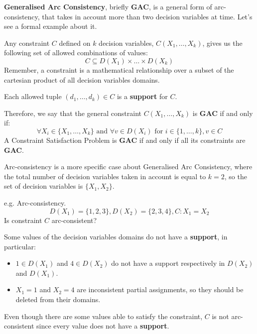 \textbf{Generalised Arc Consistency}, briefly \textbf{GAC}, is a general form of arc-consistency, that takes in account more than two decision variables at 
time. Let's see a formal example about it.
\begin{example}[title = Formal example]
    Any constraint $C$ defined on $k$ decision variables, $C(X_1, \dots, X_k)$, gives us the following set of allowed combinations of values:
    $$ C \subseteq D(X_1) \times \dots \times D(X_k) $$
    Remember, a constraint is a mathematical relationship over a subset of the cartesian product of all decision variables domains. \vspace{7pt}
    
    Each allowed tuple $(d_1, \dots, d_k) \in C$ is a \textbf{support} for $C$.  \vspace{7pt}

    Therefore, we say that the general constraint $C(X_1, \dots, X_k)$ is \textbf{GAC} if and only if:
    $$ \forall X_i \in \{X_1, \dots, X_k\} \text{ and } \forall v \in D(X_i) \text{ for } i \in \{1, \dots, k\}, v \in C $$
    A Constraint Satisfaction Problem is \textbf{GAC} if and only if all its constraints are \textbf{GAC}.
\end{example}
Arc-consistency is a more specific case about Generalised Arc Consistency, where the total number of decision variables taken in account is equal to $k = 2$,
so the set of decision variables is $\{X_1, X_2\}$.
\begin{example}
    e.g. Arc-consistency.
    $$ D(X_1) = \{1, 2, 3\}, D(X_2) = \{2, 3, 4\}, C: X_1 = X_2 $$
    Is constraint $C$ arc-consistent? \vspace{7pt}

    Some values of the decision variables domains do not have a \textbf{support}, in particular:
    \begin{itemize}
        \renewcommand{\labelitemi}{-}
        \item $1 \in D(X_1)$ and $4 \in D(X_2)$ do not have a support respectively in $D(X_2)$ and $D(X_1)$.
        \item $X_1 = 1$ and $X_2 = 4$ are inconsistent partial assignments, so they should be deleted from their domains.
    \end{itemize} \vspace{7pt}
    Even though there are some values able to satisfy the constraint, $C$ is not arc-consistent since every value does not have a \textbf{support}.
\end{example}
